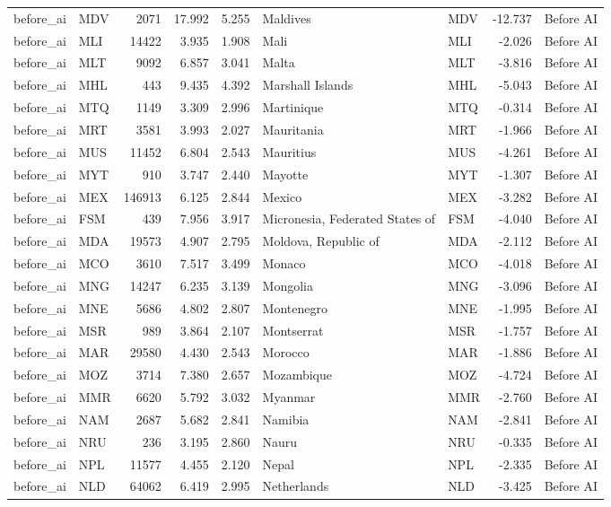 \begin{tabular}{llrrrllrl}
before\_ai & MDV & 2071 & 17.992 & 5.255 & Maldives & MDV & -12.737 & Before AI \\
before\_ai & MLI & 14422 & 3.935 & 1.908 & Mali & MLI & -2.026 & Before AI \\
before\_ai & MLT & 9092 & 6.857 & 3.041 & Malta & MLT & -3.816 & Before AI \\
before\_ai & MHL & 443 & 9.435 & 4.392 & Marshall Islands & MHL & -5.043 & Before AI \\
before\_ai & MTQ & 1149 & 3.309 & 2.996 & Martinique & MTQ & -0.314 & Before AI \\
before\_ai & MRT & 3581 & 3.993 & 2.027 & Mauritania & MRT & -1.966 & Before AI \\
before\_ai & MUS & 11452 & 6.804 & 2.543 & Mauritius & MUS & -4.261 & Before AI \\
before\_ai & MYT & 910 & 3.747 & 2.440 & Mayotte & MYT & -1.307 & Before AI \\
before\_ai & MEX & 146913 & 6.125 & 2.844 & Mexico & MEX & -3.282 & Before AI \\
before\_ai & FSM & 439 & 7.956 & 3.917 & Micronesia, Federated States of & FSM & -4.040 & Before AI \\
before\_ai & MDA & 19573 & 4.907 & 2.795 & Moldova, Republic of & MDA & -2.112 & Before AI \\
before\_ai & MCO & 3610 & 7.517 & 3.499 & Monaco & MCO & -4.018 & Before AI \\
before\_ai & MNG & 14247 & 6.235 & 3.139 & Mongolia & MNG & -3.096 & Before AI \\
before\_ai & MNE & 5686 & 4.802 & 2.807 & Montenegro & MNE & -1.995 & Before AI \\
before\_ai & MSR & 989 & 3.864 & 2.107 & Montserrat & MSR & -1.757 & Before AI \\
before\_ai & MAR & 29580 & 4.430 & 2.543 & Morocco & MAR & -1.886 & Before AI \\
before\_ai & MOZ & 3714 & 7.380 & 2.657 & Mozambique & MOZ & -4.724 & Before AI \\
before\_ai & MMR & 6620 & 5.792 & 3.032 & Myanmar & MMR & -2.760 & Before AI \\
before\_ai & NAM & 2687 & 5.682 & 2.841 & Namibia & NAM & -2.841 & Before AI \\
before\_ai & NRU & 236 & 3.195 & 2.860 & Nauru & NRU & -0.335 & Before AI \\
before\_ai & NPL & 11577 & 4.455 & 2.120 & Nepal & NPL & -2.335 & Before AI \\
before\_ai & NLD & 64062 & 6.419 & 2.995 & Netherlands & NLD & -3.425 & Before AI \\

\end{tabular}
